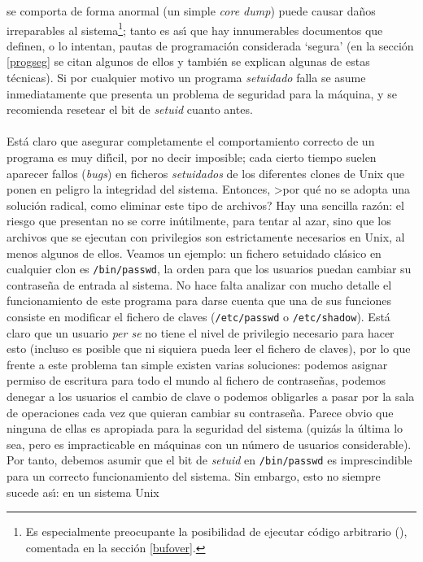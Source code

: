 se comporta de forma anormal (un simple {\it core dump}) puede causar
da\~nos irreparables al sistema\footnote{Es especialmente preocupante la 
posibilidad de ejecutar c\'odigo arbitrario (\cite{kn:ale97}), comentada en
la secci\'on \ref{bufover}.}; tanto es as\'{\i} que hay innumerables 
documentos que definen, o lo intentan, pautas de programaci\'on considerada
`segura' (en la secci\'on \ref{progseg} se citan algunos de ellos y tambi\'en
se explican algunas de estas t\'ecnicas). Si por cualquier motivo un programa
{\it setuidado} falla se asume inmediatamente que presenta un problema de
seguridad para la m\'aquina, y se recomienda resetear el bit de {\it setuid} 
cuanto antes.\\
\\Est\'a claro que asegurar completamente el comportamiento correcto de un
programa es muy dif\'{\i}cil, por no decir imposible; cada cierto tiempo suelen
aparecer fallos ({\it bugs}) en ficheros {\it setuidados} de los diferentes
clones de Unix que ponen en peligro la integridad del sistema. Entonces, >por
qu\'e no se adopta una soluci\'on radical, como eliminar este tipo de archivos?
Hay una sencilla raz\'on: el riesgo que presentan no se corre in\'utilmente,
para tentar al azar, sino que los archivos que se ejecutan con privilegios son
estrictamente necesarios en Unix, al menos algunos de ellos. Veamos un ejemplo:
un fichero setuidado cl\'asico en cualquier clon es {\tt /bin/passwd},
la orden para que los usuarios puedan cambiar su contrase\~na de entrada al
sistema. No hace falta analizar con mucho detalle el funcionamiento de este
programa para darse cuenta que una de sus funciones consiste en modificar el
fichero de claves ({\tt /etc/passwd} o {\tt /etc/shadow}). Est\'a claro que
un usuario {\it per se} no tiene el nivel de privilegio necesario para hacer
esto (incluso es posible que ni siquiera pueda leer el fichero de claves), por lo
que frente a este problema tan simple existen varias soluciones: podemos 
asignar permiso de escritura para todo el mundo al fichero de contrase\~nas, 
podemos denegar a los usuarios el cambio de clave o podemos obligarles a pasar
por la sala de operaciones cada vez que quieran cambiar su contrase\~na. Parece
obvio que ninguna de ellas es apropiada para la seguridad del sistema (quiz\'as
la \'ultima lo sea, pero es impracticable en m\'aquinas con un n\'umero de 
usuarios considerable). Por tanto, debemos asumir que el bit de {\it setuid} en
{\tt /bin/passwd} es imprescindible para un correcto funcionamiento del
sistema. Sin embargo, esto no siempre sucede as\'{\i}: en un sistema Unix 
